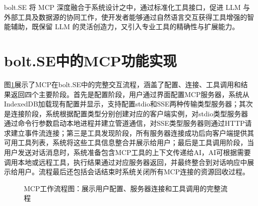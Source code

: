 bolt.SE 将 MCP 深度融合于系统设计之中，通过标准化工具接口，促进 LLM 与外部工具及数据源的协同工作，使开发者能够通过自然语言交互获得工具增强的智能辅助，既保留 LLM 的灵活创造力，又引入专业工具的精确性与扩展能力。

\section{bolt.SE中的MCP功能实现}

图\ref{fig:mcp_workflow}展示了MCP在bolt.SE中的完整交互流程，涵盖了配置、连接、工具调用和结果返回四个主要阶段。首先是配置阶段，用户通过界面配置MCP服务器，系统从IndexedDB加载现有配置并显示，支持配置stdio和SSE两种传输类型服务器；其次是连接阶段，系统根据配置类型分别创建对应的客户端实例，对stdio类型服务器通过命令行参数启动本地进程并建立管道通信，对SSE类型服务器则通过HTTP请求建立事件流连接；第三是工具发现阶段，所有服务器连接成功后向客户端提供其可用工具列表，系统将这些工具信息整合并展示给用户；最后是工具调用阶段，当用户发送对话消息时，系统准备包含MCP工具的上下文传递给AI，AI可根据需要调用本地或远程工具，执行结果通过对应服务器返回，并最终整合到对话响应中展示给用户。流程最后还包括会话结束时系统关闭所有MCP连接的资源回收过程。

\begin{figure}[H]
  \centering
  \caption{MCP工作流程图：展示用户配置、服务器连接和工具调用的完整流程}
  \label{fig:mcp_workflow}
\end{figure}

